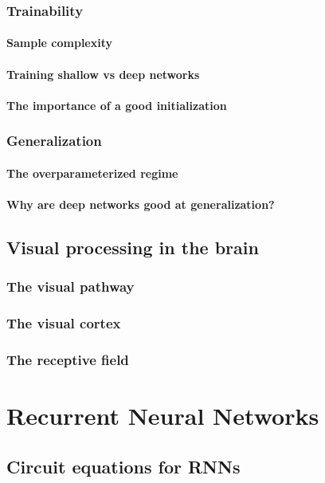 \documentclass[11pt]{book} %
\begin{document}
\subsection{Trainability}
\subsubsection{Sample complexity}
\subsubsection{Training shallow vs deep networks}
\subsubsection{The importance of a good initialization}
\subsection{Generalization}
\subsubsection{The overparameterized regime}
\subsubsection{Why are deep networks good at generalization?}

\section{Visual processing in the brain}
\subsection{The visual pathway}
\subsection{The visual cortex}
\subsection{The receptive field}


%
%
%
%
%
%
%
%
%
%
%
%
%
%
%
%


\chapter{Recurrent Neural Networks}

\section{Circuit equations for RNNs}
\end{document}
